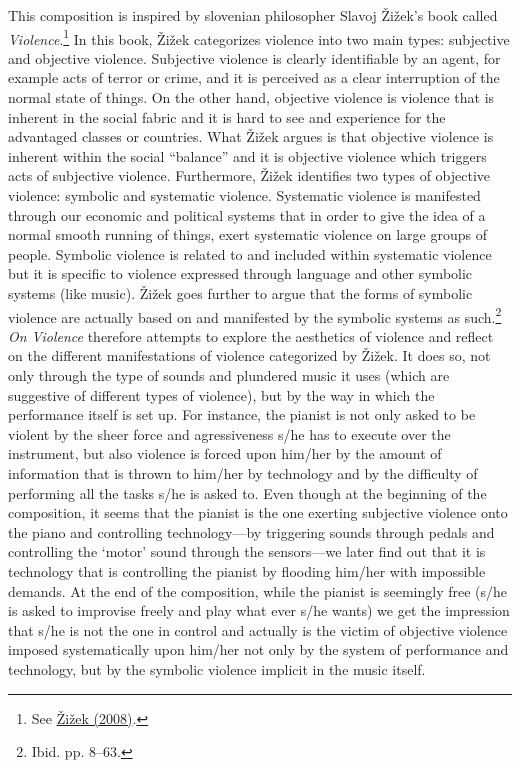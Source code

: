 This composition is inspired by slovenian philosopher Slavoj \v{Z}i\v{z}ek's book called \emph{Violence}.\footnote{See \hyperlink{zizekviolence}{\v{Z}i\v{z}ek (2008)}.}
In this book, \v{Z}i\v{z}ek categorizes violence into two main types: subjective and objective violence. Subjective violence is clearly identifiable by an agent, for example acts of terror or crime, and it is perceived as a clear interruption of the normal state of things. On the other hand, objective violence is violence that is inherent in the social fabric and it is hard to see and experience for the advantaged classes or countries. What \v{Z}i\v{z}ek argues is that objective violence is inherent within the social ``balance'' and it is objective violence which triggers acts of subjective violence. Furthermore, \v{Z}i\v{z}ek identifies two types of objective violence: symbolic and systematic violence. Systematic violence is manifested through our economic and political systems that in order to give the idea of a normal smooth running of things, exert systematic violence on large groups of people. Symbolic violence is related to and included within systematic violence but it is specific to violence expressed through language and other symbolic systems (like music). \v{Z}i\v{z}ek goes further to argue that the forms of symbolic violence are actually based on and manifested by the symbolic systems as such.\footnote{Ibid. pp. 8--63.} \emph{On Violence} therefore attempts to explore the aesthetics of violence and reflect on the different manifestations of violence categorized by \v{Z}i\v{z}ek. It does so, not only through the type of sounds and plundered music it uses (which are suggestive of different types of violence), but by the way in which the performance itself is set up. For instance, the pianist is not only asked to be violent by the sheer force and agressiveness s/he has to execute over the instrument, but also violence is forced upon him/her by the amount of information that is thrown to him/her by technology and by the difficulty of performing all the tasks s/he is asked to. Even though at the beginning of the composition, it seems that the pianist is the one exerting subjective violence onto the piano and controlling technology---by triggering sounds through pedals and controlling the `motor' sound through the sensors---we later find out that it is technology that is controlling the pianist by flooding him/her with impossible demands. At the end of the composition, while the pianist is seemingly free (s/he is asked to improvise freely and play what ever s/he wants) we get the impression that s/he is not the one in control and actually is the victim of objective violence imposed systematically upon him/her not only by the system of performance and technology, but by the symbolic violence implicit in the music itself.

